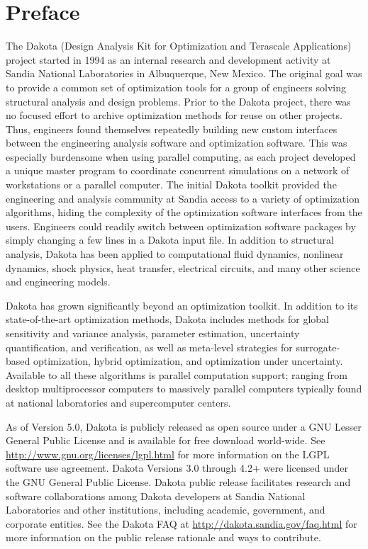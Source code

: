 \chapter*{Preface}

The Dakota (Design Analysis Kit for Optimization and Terascale
Applications) project started in 1994 as an internal research and
development activity at Sandia National Laboratories in Albuquerque,
New Mexico. The original goal was to provide a common set of
optimization tools for a group of engineers solving structural
analysis and design problems. Prior to the Dakota project, there was
no focused effort to archive optimization methods for reuse on other
projects. Thus, engineers found themselves repeatedly building new
custom interfaces between the engineering analysis software and
optimization software. This was especially burdensome when using
parallel computing, as each project developed a unique master program
to coordinate concurrent simulations on a network of workstations or a
parallel computer. The initial Dakota toolkit provided the engineering
and analysis community at Sandia access to a variety of optimization
algorithms, hiding the complexity of the optimization software
interfaces from the users. Engineers could readily switch between
optimization software packages by simply changing a few lines in a
Dakota input file. In addition to structural analysis, Dakota has been
applied to computational fluid dynamics, nonlinear dynamics, shock
physics, heat transfer, electrical circuits, and many other science
and engineering models.

Dakota has grown significantly beyond an optimization toolkit.  In
addition to its state-of-the-art optimization methods, Dakota includes
methods for global sensitivity and variance analysis, parameter
estimation, uncertainty quantification, and verification, as well as
meta-level strategies for surrogate-based optimization, hybrid
optimization, and optimization under uncertainty. Available to all
these algorithms is parallel computation support; ranging from desktop
multiprocessor computers to massively parallel computers typically
found at national laboratories and supercomputer centers.

As of Version 5.0, Dakota is publicly released as open source under a
GNU Lesser General Public License and is available for free download
world-wide.  See \url{http://www.gnu.org/licenses/lgpl.html} for more
information on the LGPL software use agreement.  Dakota Versions 3.0
through 4.2+ were licensed under the GNU General Public License.
Dakota public release facilitates research and software collaborations
among Dakota developers at Sandia National Laboratories and other
institutions, including academic, government, and corporate
entities. See the Dakota FAQ at
\url{http://dakota.sandia.gov/faq.html} for more information on the
public release rationale and ways to contribute.

